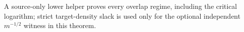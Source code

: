 A source-only lower helper proves every overlap regime, including the critical logarithm; strict target-density slack is used only for the optional independent \(m^{-1/2}\) witness in this theorem.